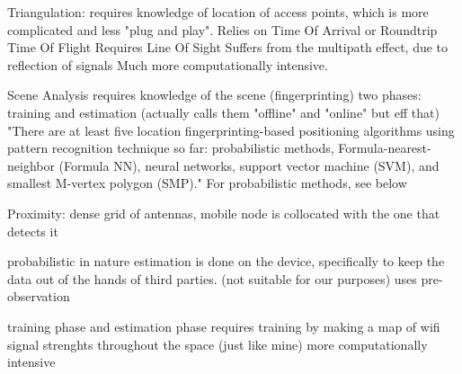 	Triangulation:
		requires knowledge of location of access points, which is more complicated and less "plug and play". 
		Relies on Time Of Arrival or Roundtrip Time Of Flight
		Requires Line Of Sight
		Suffers from the multipath effect, due to reflection of signals
		Much more computationally intensive.
		
	Scene Analysis
		requires knowledge of the scene (fingerprinting)
		two phases: training and estimation (actually calls them "offline" and "online" but eff that)
		"There are at least five location fingerprinting-based positioning algorithms using pattern recognition technique so far: probabilistic methods, Formula-nearest-neighbor (Formula NN), neural networks, support vector machine (SVM), and smallest M-vertex polygon (SMP)."
		For probabilistic methods, see below
		
	Proximity:
		dense grid of antennas, mobile node is collocated with the one that detects it



\cite{ito2005bayesian}
	probabilistic in nature
	estimation is done on the device, specifically to keep the data out of the hands of third parties. (not suitable for our purposes)
	uses pre-observation
	
	
\cite{seshadri2005bayesian}
	training phase and estimation phase
	requires training by making a map of wifi signal strenghts throughout the space (just like mine)
	more computationally intensive
	


\cite{hotta2012robust}


\cite{arias2004malguki}
\cite{quan2010wi}
\cite{nagaosa2012dept}


\cite{priyantha2005cricket}
\cite{xiong2012towards}
\cite{xiong2013arraytrack}
\cite{bahl2000enhancements}
\cite{bahl2000radar}
\cite{turner2011empirical}


	
	
